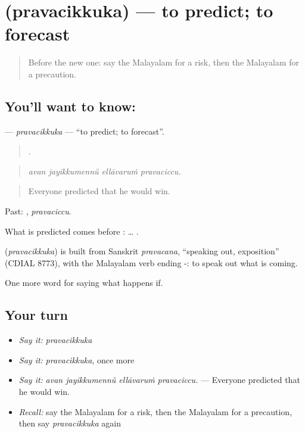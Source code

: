 \section[\texorpdfstring{\ml{പ്രവചിക്കുക} (pravacikkuka)}{പ്രവചിക്കുക (pravacikkuka)}]{ (pravacikkuka) — to predict; to forecast}

\label{lesson:ML-C442-pravacikkuka}



\begin{quote}
Before the new one: say the Malayalam for a risk, then the Malayalam for a precaution.
\end{quote}

\subsection*{You'll want to know: }
\textbf{} — \emph{pravacikkuka} — \textquotedblleft{}to predict; to forecast\textquotedblright{}.

\begin{quote}
   .
\end{quote}

\begin{quote}
\emph{avan jayikkumennŭ ellāvaruṁ pravaciccu.}
\end{quote}

\begin{quote}
Everyone predicted that he would win.
\end{quote}

Past: , \emph{pravaciccu}.

What is predicted comes before : …  .

\begin{cousinweb}
\textbf{} (\emph{pravacikkuka}) is built from Sanskrit \emph{pravacana}, \textquotedblleft{}speaking out, exposition\textquotedblright{} (CDIAL 8773), with the Malayalam verb ending -: to speak out what is coming.
\end{cousinweb}

\begin{grammarlens}[title={What you've built}]
One more word for saying what happens if.
\end{grammarlens}

\subsection*{Your turn}
\begin{itemize}
\raggedright
  \item \emph{Say it:} \emph{pravacikkuka}
  \item \emph{Say it:} \emph{pravacikkuka}, once more
  \item \emph{Say it:} \emph{avan jayikkumennŭ ellāvaruṁ pravaciccu.} — Everyone predicted that he would win.
  \item \emph{Recall:} say the Malayalam for a risk, then the Malayalam for a precaution, then say \emph{pravacikkuka} again
\end{itemize}

